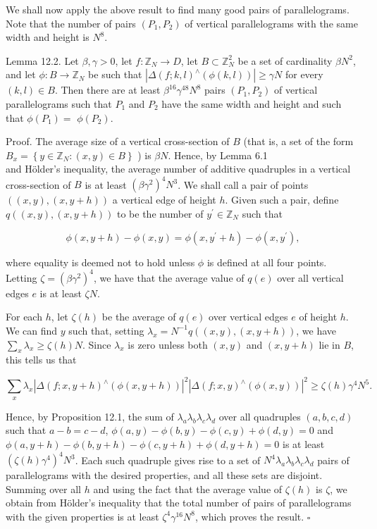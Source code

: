 \documentclass[10pt]{article}
\begin{document}
We shall now apply the above result to find many good pairs of parallelograms. Note that the number of pairs $\left(P_{1}, P_{2}\right)$ of vertical parallelograms with the same width and height is $N^{8}$.

Lemma 12.2. Let $\beta,\gamma>0$, let $f: \mathbb{Z}_{N} \rightarrow D$, let $B \subset \mathbb{Z}_{N}^{2}$ be a set of cardinality $\beta N^{2}$, and let $\phi:B\to\mathbb Z_N$ be such that $\left|\Delta(f ; k, l)^{\wedge}(\phi(k, l))\right| \geqslant \gamma N$ for every $(k, l) \in B$. Then there are at least $\beta^{16} \gamma^{48} N^{8}$ pairs $\left(P_{1}, P_{2}\right)$ of vertical parallelograms such that $P_{1}$ and $P_{2}$ have the same width and height and such that $\phi\left(P_{1}\right)=$ $\phi\left(P_{2}\right)$.

Proof. The average size of a vertical cross-section of $B$ (that is, a set of the form $B_{x}=\left\{y \in \mathbb{Z}_{N}:(x, y) \in B\right\}$ ) is $\beta N$. Hence, by Lemma 6.1\\
and Hölder's inequality, the average number of additive quadruples in a vertical cross-section of $B$ is at least $\left(\beta \gamma^{2}\right)^{4} N^{3}$. We shall call a pair of points $((x, y),(x, y+h))$ a vertical edge of height $h$. Given such a pair, define $q((x, y),(x, y+h))$ to be the number of $y^{\prime} \in \mathbb{Z}_{N}$ such that

$$
\phi(x, y+h)-\phi(x, y)=\phi\left(x, y^{\prime}+h\right)-\phi\left(x, y^{\prime}\right),
$$

where equality is deemed not to hold unless $\phi$ is defined at all four points. Letting $\zeta=\left(\beta \gamma^{2}\right)^{4}$, we have that the average value of $q(e)$ over all vertical edges $e$ is at least $\zeta N$.

For each $h$, let $\zeta(h)$ be the average of $q(e)$ over vertical edges $e$ of height $h$. We can find $y$ such that, setting $\lambda_{x}=N^{-1} q((x, y),(x, y+h))$, we have $\sum_{x} \lambda_{x} \geqslant \zeta(h) N$. Since $\lambda_{x}$ is zero unless both $(x, y)$ and $(x, y+h)$ lie in $B$, this tells us that

$$
\sum_{x} \lambda_{x}\left|\Delta(f ; x, y+h)^{\wedge}(\phi(x, y+h))\right|^{2}\left|\Delta(f ; x, y)^{\wedge}(\phi(x, y))\right|^{2} \geqslant \zeta(h) \gamma^{4} N^{5} .
$$

Hence, by Proposition 12.1, the sum of $\lambda_{a} \lambda_{b} \lambda_{c} \lambda_{d}$ over all quadruples $(a, b, c, d)$ such that $a-b=c-d$, $\phi(a, y)-\phi(b, y)-\phi(c, y)+\phi(d, y)=0$ and $\phi(a, y+h)-\phi(b, y+h)-\phi(c, y+h)+\phi(d, y+h)=0$ is at least $\left(\zeta(h) \gamma^{4}\right)^{4} N^{3}$. Each such quadruple gives rise to a set of $N^{4} \lambda_{a} \lambda_{b} \lambda_{c} \lambda_{d}$ pairs of parallelograms with the desired properties, and all these sets are disjoint. Summing over all $h$ and using the fact that the average value of $\zeta(h)$ is $\zeta$, we obtain from Hölder's inequality that the total number of pairs of parallelograms with the given properties is at least $\zeta^{4} \gamma^{16} N^{8}$, which proves the result. \(\square\)
\end{document}
